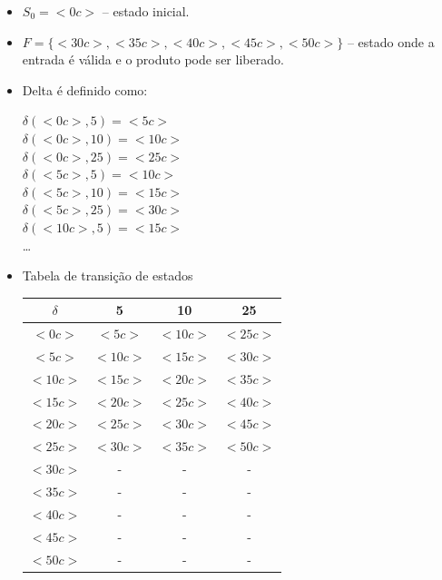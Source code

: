 \documentclass[12pt]{article}
\begin{document}
\begin{itemize}
\begin{itemize}
\begin{itemize}
\begin{itemize}
                \item $S_0 = <0c>$ -- estado inicial.
                \item $F = \{<30c>,<35c>,<40c>,<45c>,<50c>\}$ -- estado onde a 
                entrada é válida e o produto pode ser liberado.
                \item Delta é definido como: 
                \begin{center}
                        $\delta(<0c>, 5)=<5c>$ \\
                        $\delta(<0c>, 10)=<10c>$ \\
                        $\delta(<0c>, 25)=<25c>$ \\
                        $\delta(<5c>, 5)=<10c>$ \\
                        $\delta(<5c>, 10)=<15c>$ \\
                        $\delta(<5c>, 25)=<30c>$ \\
                        $\delta(<10c>, 5)=<15c>$ \\
                        \dots
                \end{center}
                \item Tabela de transição de estados
                \begin{table}[H]
                    \centering
                    \begin{tabular}{|c|ccc|}
                        \hline
                        $\delta$ & 5 & 10 & 25 \\ \hline 
                        $<0c>$ & $<5c>$ & $<10c>$ & $<25c>$ \\
                        $<5c>$ & $<10c>$ & $<15c>$ & $<30c>$ \\ 
                        $<10c>$ & $<15c>$ & $<20c>$ & $<35c>$ \\ 
                        $<15c>$ & $<20c>$ & $<25c>$ & $<40c>$ \\ 
                        $<20c>$ & $<25c>$ & $<30c>$ & $<45c>$ \\ 
                        $<25c>$ & $<30c>$ & $<35c>$ & $<50c>$ \\ 
                        $<30c>$ & - & - & - \\ 
                        $<35c>$ & - & - & - \\ 
                        $<40c>$ & - & - & - \\ 
                        $<45c>$ & - & - & - \\ 
                        $<50c>$ & - & - & - \\ 

\end{tabular}
\end{table}
\end{itemize}
\end{itemize}
\end{itemize}
\end{itemize}
\end{document}
